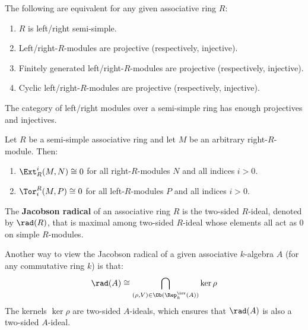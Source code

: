             \begin{lemma} \label{lemma: projective_and_injective_modules_over_semi_simple_rings}
                \cite[Theorem 2.8]{lam_first_course_in_noncommutative_rings} The following are equivalent for any given associative ring $R$:
                    \begin{enumerate}
                        \item $R$ is left/right semi-simple.
                        \item Left/right-$R$-modules are projective (respectively, injective).
                        \item Finitely generated left/right-$R$-modules are projective (respectively, injective).
                        \item Cyclic left/right-$R$-modules are projective (respectively, injective).
                    \end{enumerate}
            \end{lemma}
            \begin{corollary}
                The category of left/right modules over a semi-simple ring has enough projectives and injectives.
            \end{corollary}
            \begin{corollary} \label{coro: (co)homology_of_modules_over_semi_simple_rings}
                Let $R$ be a semi-simple associative ring and let $M$ be an arbitrary right-$R$-module. Then:
                    \begin{enumerate}
                        \item $\Ext_R^i(M, N) \cong 0$ for all right-$R$-modules $N$ and all indices $i > 0$. 
                        \item $\Tor^R_i(M, P) \cong 0$ for all left-$R$-modules $P$ and all indices $i > 0$. 
                    \end{enumerate}
            \end{corollary}
            \begin{definition} \label{def: jacobson_radicals}
                The \textbf{Jacobson radical} of an associative ring $R$ is the two-sided $R$-ideal, denoted by $\rad(R)$, that is maximal among two-sided $R$-ideal whose elements all act as $0$ on simple $R$-modules.
            \end{definition}
            \begin{remark} \label{remark: jacobson_radicals_as_intersections_of_kernels}
                Another way to view the Jacobson radical of a given associative $k$-algebra $A$ (for any commutative ring $k$) is that:
                    $$\rad(A) \cong \bigcap_{(\rho, V) \in \Ob(\Rep_k^{\irr}(A))} \ker \rho$$
                The kernels $\ker \rho$ are two-sided $A$-ideals, which ensures that $\rad(A)$ is also a two-sided $A$-ideal.
            \end{remark}
